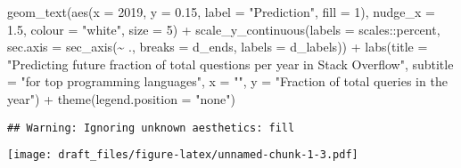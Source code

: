 \documentclass[
]{article}
\newenvironment{Shaded}{\begin{snugshade}}{\end{snugshade}}
\newcommand{\AttributeTok}[1]{\textcolor[rgb]{0.77,0.63,0.00}{#1}}
\newcommand{\DecValTok}[1]{\textcolor[rgb]{0.00,0.00,0.81}{#1}}
\newcommand{\FloatTok}[1]{\textcolor[rgb]{0.00,0.00,0.81}{#1}}
\newcommand{\FunctionTok}[1]{\textcolor[rgb]{0.00,0.00,0.00}{#1}}
\newcommand{\NormalTok}[1]{#1}
\newcommand{\SpecialCharTok}[1]{\textcolor[rgb]{0.00,0.00,0.00}{#1}}
\newcommand{\StringTok}[1]{\textcolor[rgb]{0.31,0.60,0.02}{#1}}
\begin{document}
\begin{Shaded}
\begin{Highlighting}[]
  \FunctionTok{geom\_text}\NormalTok{(}\FunctionTok{aes}\NormalTok{(}\AttributeTok{x =} \DecValTok{2019}\NormalTok{, }\AttributeTok{y =} \FloatTok{0.15}\NormalTok{, }\AttributeTok{label =} \StringTok{"Prediction"}\NormalTok{, }\AttributeTok{fill =} \DecValTok{1}\NormalTok{), }\AttributeTok{nudge\_x =} \FloatTok{1.5}\NormalTok{, }\AttributeTok{colour =} \StringTok{"white"}\NormalTok{, }\AttributeTok{size =} \DecValTok{5}\NormalTok{) }\SpecialCharTok{+}
  \FunctionTok{scale\_y\_continuous}\NormalTok{(}\AttributeTok{labels =}\NormalTok{ scales}\SpecialCharTok{::}\NormalTok{percent,  }\AttributeTok{sec.axis =} \FunctionTok{sec\_axis}\NormalTok{(}\SpecialCharTok{\textasciitilde{}}\NormalTok{ ., }\AttributeTok{breaks =}\NormalTok{ d\_ends, }\AttributeTok{labels =}\NormalTok{ d\_labels)) }\SpecialCharTok{+}
  \FunctionTok{labs}\NormalTok{(}\AttributeTok{title =} \StringTok{"Predicting future fraction of total questions per year in Stack Overflow"}\NormalTok{,}
       \AttributeTok{subtitle =} \StringTok{"for top programming languages"}\NormalTok{,}
       \AttributeTok{x =} \StringTok{""}\NormalTok{, }
       \AttributeTok{y =} \StringTok{"Fraction of total queries in the year"}\NormalTok{) }\SpecialCharTok{+}
  \FunctionTok{theme}\NormalTok{(}\AttributeTok{legend.position =} \StringTok{"none"}\NormalTok{) }
\end{Highlighting}
\end{Shaded}

\begin{verbatim}
## Warning: Ignoring unknown aesthetics: fill
\end{verbatim}

\texttt{[image: draft\_files/figure-latex/unnamed-chunk-1-3.pdf]}
\end{document}
